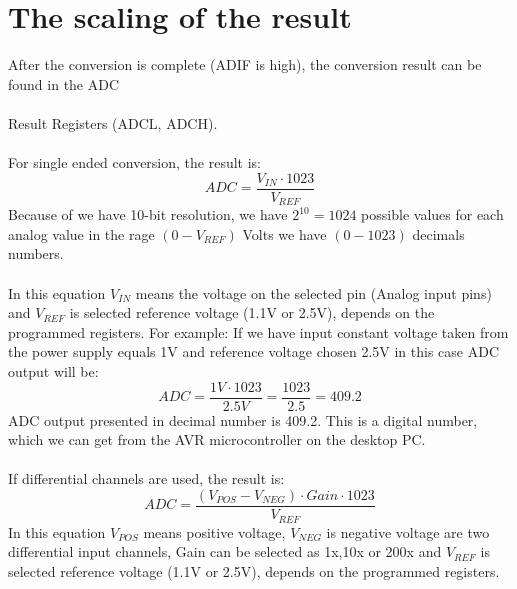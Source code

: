 \documentclass[english]{article}
\begin{document}
\section{The scaling of the result}
After the conversion is complete (ADIF is high), the conversion result can be found in the ADC\\\\ Result Registers (ADCL, ADCH).\\\\
For single ended conversion, the result is:
$$
ADC=\frac{V_{IN}\cdot 1023}{V_{REF}}
$$
Because of we have 10-bit resolution, we have $2^{10}=1024$ possible values for each analog value in the rage $(0-V_{REF})$ Volts we have $(0 - 1023)$ decimals numbers.\\\\
In this equation $V_{IN}$ means the voltage on the selected pin (Analog input pins) and $V_{REF}$ is selected reference voltage (1.1V or 2.5V), depends on the programmed registers. For example: If we have input constant voltage taken from the power supply equals 1V and reference voltage chosen 2.5V in this case ADC output will be:
$$
ADC=\frac{1V \cdot 1023}{2.5V}=\frac{1023}{2.5}=409.2
$$
ADC output presented in decimal number is 409.2. This is a digital number, which we can get from the AVR microcontroller on the desktop PC.\\\\
If differential channels are used, the result is:
$$
ADC=\frac{(V_{POS}-V_{NEG})\cdot Gain \cdot 1023}{V_{REF}}
$$
In this equation $V_{POS}$ means positive voltage, $V_{NEG}$ is negative voltage are two differential input channels, Gain can be selected as 1x,10x or 200x and $V_{REF}$ is selected reference voltage (1.1V or 2.5V), depends on the programmed registers.
\end{document}
